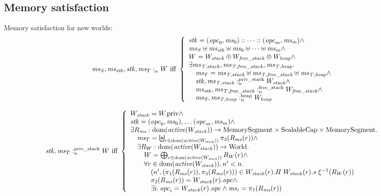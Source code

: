 \documentclass[a4paper]{article}
\begin{document}
\subsection{Memory satisfaction}
{\color{DarkGreen}
Memory satisfaction for new worlds:
\[
  \mathit{ms}_S,\mathit{ms}_{\mathit{stk}},\mathit{stk},\mathit{ms}_T :_{n}^{}W \text{ iff } 
  \left\{
    \begin{array}{l}
      \mathit{stk} = (\mathit{opc}_0,\mathit{ms}_0):: \dots :: (\mathit{opc}_m,\mathit{ms}_m) \wedge \\
      \mathit{ms}_S \uplus \mathit{ms}_{\mathit{stk}} \uplus \mathit{ms}_0 \uplus \dots \uplus \mathit{ms}_m  \wedge\\
      W = W_{\mathit{stack}} \oplus W_{\mathit{free\_stack}} \oplus W_{\mathit{heap}} \wedge\\
      \exists \mathit{ms}_{\mathit{T,stack}}, \mathit{ms}_{\mathit{T,free\_stack}}, \mathit{ms}_{\mathit{T,heap}}\ldotp \\
      \quad \mathit{ms}_T = \mathit{ms}_{\mathit{T,stack}} \uplus \mathit{ms}_{\mathit{T,free\_stack}} \uplus \mathit{ms}_{\mathit{T,heap}} \wedge \\
      \quad \mathit{stk},\mathit{ms}_{\mathit{T,stack}} :_{n}^{\text{priv\_stack}}W_{\mathit{stack}} \wedge \\
      \quad \mathit{ms}_{\mathit{stk}},\mathit{ms}_{\mathit{T,free\_stack}} :_{n}^{\text{free\_stack}}W_{\mathit{free\_stack}} \wedge \\
      \quad \mathit{ms}_S,\mathit{ms}_{\mathit{T,heap}} :_{n}^{\text{heap}}W_{\mathit{heap}}
    \end{array}
  \right.
\]


\[
  \memSatStack{\stk,\ms_T}{W} \text{ iff } 
  \left\{
    \begin{array}{l}
      W_\var{stack} = \pwpriv \wedge \\
      \stk = (\opc_0,\ms_0), \dots (\opc_m,\ms_m) \wedge \\
      \exists R_\ms : \dom(\activeReg{W_\var{stack}}) \fun \MemSeg \times \SealableCaps \times \MemSeg \ldotp \\
      \quad \ms_T = \biguplus_{r \in \dom(\activeReg{W_\var{stack}})} \pi_3(R_\ms(r)) \wedge \\
      \quad \exists R_W : \dom(\activeReg{W_\var{stack}}) \fun \World \ldotp \\
      \qquad W = \bigoplus_{r \in \dom(\activeReg{W_\var{stack}})} R_W(r) \wedge \\
      \qquad \forall r \in \dom(\activeReg{W_\var{stack}}), n' < n \ldotp \\
      \qquad \quad \npair[n']{(\pi_1(R_\ms(r)),\pi_3(R_\ms(r))} \in W_\var{stack}(r).H \; W_\var{stack}(r).s \; \xi^{-1}(R_W(r)) \\
      \qquad \quad \pi_2(R_\ms(r)) = W_\var{stack}(r).\opc \wedge\\
      \qquad \quad \exists i \ldotp \opc_i = W_\var{stack}(r).\opc \wedge \ms_i = \pi_1 (R_\ms(r))
    \end{array}
  \right.
\]

}
\end{document}
